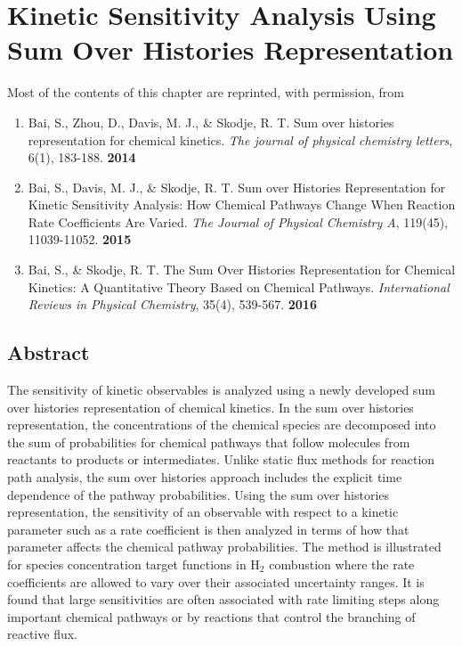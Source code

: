 \chapter{Kinetic Sensitivity Analysis Using Sum Over Histories Representation}
\label{chapter3}
Most of the contents of this chapter are reprinted, with permission, from \
\begin{enumerate}
\item[\cite{ch1_IRPC_16_bai2014sum}] Bai, S., Zhou, D., Davis, M. J., \& Skodje, R. T. Sum over histories representation for chemical kinetics. \textit{The journal of physical chemistry letters}, 6(1), 183-188. \textbf{2014}
\item[\cite{bai2015sum}] Bai, S., Davis, M. J., \& Skodje, R. T. Sum over Histories Representation for Kinetic Sensitivity Analysis: How Chemical Pathways Change When Reaction Rate Coefficients Are Varied. \textit{The Journal of Physical Chemistry A}, 119(45), 11039-11052. \textbf{2015}
\item[\cite{ch4_10_bai2016sum}] Bai, S., \& Skodje, R. T. The Sum Over Histories Representation for Chemical Kinetics: A Quantitative Theory Based on Chemical Pathways. \textit{International Reviews in Physical Chemistry}, 35(4), 539-567. \textbf{2016}
\end{enumerate}

\section{Abstract}
The sensitivity of kinetic observables is analyzed using a newly
developed sum over histories representation of chemical kinetics. In the sum
over histories representation, the concentrations of the chemical species are
decomposed into the sum of probabilities for chemical pathways that follow
molecules from reactants to products or intermediates. Unlike static flux
methods for reaction path analysis, the sum over histories approach includes the
explicit time dependence of the pathway probabilities. Using the sum over
histories representation, the sensitivity of an observable with respect to a kinetic
parameter such as a rate coefficient is then analyzed in terms of how that
parameter affects the chemical pathway probabilities. The method is illustrated
for species concentration target functions in H$_2$ combustion where the rate
coefficients are allowed to vary over their associated uncertainty ranges. It is
found that large sensitivities are often associated with rate limiting steps along
important chemical pathways or by reactions that control the branching of
reactive flux.

